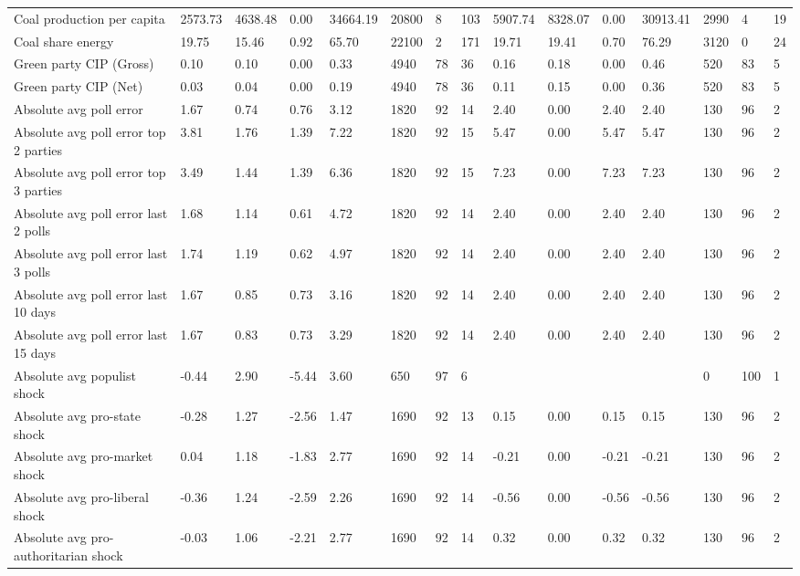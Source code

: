 \begin{longtable}{lllllllllllllll}
Coal production per capita & 2573.73 & 4638.48 & 0.00 & 34664.19 & 20800 & 8 & 103 & 5907.74 & 8328.07 & 0.00 & 30913.41 & 2990 & 4 & 19\\
Coal share energy & 19.75 & 15.46 & 0.92 & 65.70 & 22100 & 2 & 171 & 19.71 & 19.41 & 0.70 & 76.29 & 3120 & 0 & 24\\
\addlinespace
Green party CIP (Gross) & 0.10 & 0.10 & 0.00 & 0.33 & 4940 & 78 & 36 & 0.16 & 0.18 & 0.00 & 0.46 & 520 & 83 & 5\\
Green party CIP (Net) & 0.03 & 0.04 & 0.00 & 0.19 & 4940 & 78 & 36 & 0.11 & 0.15 & 0.00 & 0.36 & 520 & 83 & 5\\
Absolute avg poll error & 1.67 & 0.74 & 0.76 & 3.12 & 1820 & 92 & 14 & 2.40 & 0.00 & 2.40 & 2.40 & 130 & 96 & 2\\
Absolute avg poll error top 2 parties & 3.81 & 1.76 & 1.39 & 7.22 & 1820 & 92 & 15 & 5.47 & 0.00 & 5.47 & 5.47 & 130 & 96 & 2\\
Absolute avg poll error top 3 parties & 3.49 & 1.44 & 1.39 & 6.36 & 1820 & 92 & 15 & 7.23 & 0.00 & 7.23 & 7.23 & 130 & 96 & 2\\
\addlinespace
Absolute avg poll error last 2 polls & 1.68 & 1.14 & 0.61 & 4.72 & 1820 & 92 & 14 & 2.40 & 0.00 & 2.40 & 2.40 & 130 & 96 & 2\\
Absolute avg poll error last 3 polls & 1.74 & 1.19 & 0.62 & 4.97 & 1820 & 92 & 14 & 2.40 & 0.00 & 2.40 & 2.40 & 130 & 96 & 2\\
Absolute avg poll error last 10 days & 1.67 & 0.85 & 0.73 & 3.16 & 1820 & 92 & 14 & 2.40 & 0.00 & 2.40 & 2.40 & 130 & 96 & 2\\
Absolute avg poll error last 15 days & 1.67 & 0.83 & 0.73 & 3.29 & 1820 & 92 & 14 & 2.40 & 0.00 & 2.40 & 2.40 & 130 & 96 & 2\\
Absolute avg populist shock & -0.44 & 2.90 & -5.44 & 3.60 & 650 & 97 & 6 &  &  &  &  & 0 & 100 & 1\\
\addlinespace
Absolute avg pro-state shock & -0.28 & 1.27 & -2.56 & 1.47 & 1690 & 92 & 13 & 0.15 & 0.00 & 0.15 & 0.15 & 130 & 96 & 2\\
Absolute avg pro-market shock & 0.04 & 1.18 & -1.83 & 2.77 & 1690 & 92 & 14 & -0.21 & 0.00 & -0.21 & -0.21 & 130 & 96 & 2\\
Absolute avg pro-liberal shock & -0.36 & 1.24 & -2.59 & 2.26 & 1690 & 92 & 14 & -0.56 & 0.00 & -0.56 & -0.56 & 130 & 96 & 2\\
Absolute avg pro-authoritarian shock & -0.03 & 1.06 & -2.21 & 2.77 & 1690 & 92 & 14 & 0.32 & 0.00 & 0.32 & 0.32 & 130 & 96 & 2\\

\end{longtable}
